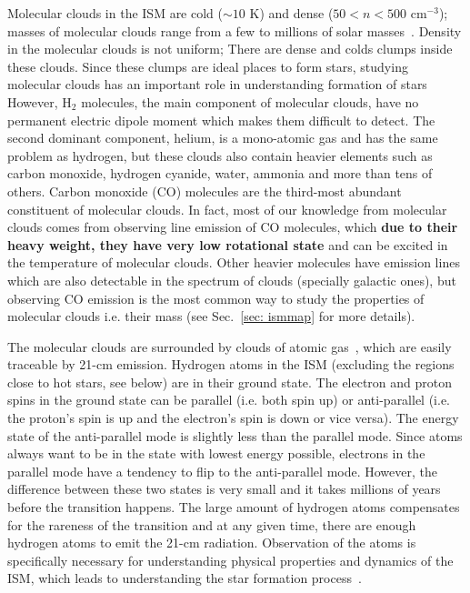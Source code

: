 Molecular clouds in the ISM are cold ($\sim10$ K) and dense ($ 50<n<500$ cm$^{-3}$); masses of molecular clouds range from a few to millions of solar masses~\citep{Bolato08}.
Density in the molecular clouds is not uniform; There are dense and colds clumps inside these clouds.
Since these clumps are ideal places to form stars, studying molecular clouds has an important role in understanding formation of stars
However, H$_2$ molecules, the main component of molecular clouds, have no permanent electric dipole moment which makes them difficult to detect.
The second dominant component, helium, is a mono-atomic gas and has the same problem as hydrogen, but these clouds also contain heavier elements such as carbon monoxide, hydrogen cyanide, water, ammonia and more than tens of others.
Carbon monoxide (CO) molecules are the third-most abundant constituent of molecular clouds.
In fact, most of our knowledge from molecular clouds comes from observing line emission of CO molecules, which {\bf due to their heavy weight, they have very low rotational state} and can be excited in the temperature of molecular clouds. %
Other heavier molecules have emission lines which are also detectable in the spectrum of clouds (specially galactic ones), but observing CO emission is the most common way to study the properties of molecular clouds i.e. their mass (see Sec.~\ref{sec: ismmap} for more details).

The molecular clouds are surrounded by clouds of atomic gas~\citep{Kennicutt12}, which are easily traceable by 21-cm emission.
Hydrogen atoms in the ISM (excluding the regions close to hot stars, see below) are in their ground state. 
The electron and proton spins in the ground state can be parallel (i.e. both spin up) or anti-parallel (i.e. the proton's spin is up and the electron's spin is down or vice versa). 
The energy state of the anti-parallel mode is slightly less than the parallel mode.
Since atoms always want to be in the state with lowest energy possible, electrons in the parallel mode have a tendency to flip to the anti-parallel mode. 
However, the difference between these two states is very small and it takes millions of years before the transition happens.
The large amount of hydrogen atoms compensates for the rareness of the transition and at any given time, there are enough hydrogen atoms to emit the 21-cm radiation. 
Observation of the \hi atoms is specifically necessary for understanding physical properties and dynamics of the ISM, which leads to understanding the star formation process~\citep{Walter08}.

